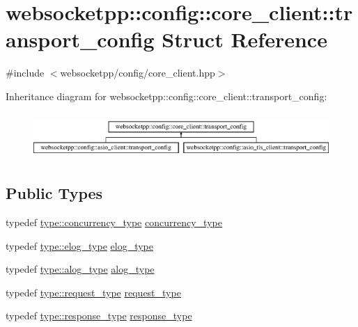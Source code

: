 \hypertarget{structwebsocketpp_1_1config_1_1core__client_1_1transport__config}{}\section{websocketpp\+:\+:config\+:\+:core\+\_\+client\+:\+:transport\+\_\+config Struct Reference}
\label{structwebsocketpp_1_1config_1_1core__client_1_1transport__config}


{\ttfamily \#include $<$websocketpp/config/core\+\_\+client.\+hpp$>$}

Inheritance diagram for websocketpp\+:\+:config\+:\+:core\+\_\+client\+:\+:transport\+\_\+config\+:\begin{figure}[H]
\begin{center}
\leavevmode
\includegraphics[height=1.766562cm]{structwebsocketpp_1_1config_1_1core__client_1_1transport__config}
\end{center}
\end{figure}
\subsection*{Public Types}
\begin{DoxyCompactItemize}
\item 
typedef \hyperlink{structwebsocketpp_1_1config_1_1core__client_a4efeeb870e648c7405daab92d10fa5d6}{type\+::concurrency\+\_\+type} \hyperlink{structwebsocketpp_1_1config_1_1core__client_1_1transport__config_a5389723cc4121177af00f6f32fe0f89d}{concurrency\+\_\+type}
\item 
typedef \hyperlink{structwebsocketpp_1_1config_1_1core__client_a24f1bae9e8a92bf7950153ed39eaffb8}{type\+::elog\+\_\+type} \hyperlink{structwebsocketpp_1_1config_1_1core__client_1_1transport__config_a898406c4885d089ecd5e384044645c84}{elog\+\_\+type}
\item 
typedef \hyperlink{structwebsocketpp_1_1config_1_1core__client_a98c19fba0898e3842c001248df82fb2a}{type\+::alog\+\_\+type} \hyperlink{structwebsocketpp_1_1config_1_1core__client_1_1transport__config_aa41ba2c4801fadf51c399fd409118c61}{alog\+\_\+type}
\item 
typedef \hyperlink{structwebsocketpp_1_1config_1_1core__client_a1fd74b16e3add246b1c356f6f14f206b}{type\+::request\+\_\+type} \hyperlink{structwebsocketpp_1_1config_1_1core__client_1_1transport__config_a81d8b4e1d7bb8975731aa03690821fa4}{request\+\_\+type}
\item 
typedef \hyperlink{structwebsocketpp_1_1config_1_1core__client_a5d8d6a90c7f36442a61a615da2ac8dcc}{type\+::response\+\_\+type} \hyperlink{structwebsocketpp_1_1config_1_1core__client_1_1transport__config_ae2a3007f9ac70a89ce353db54dda0ad8}{response\+\_\+type}
\end{DoxyCompactItemize}

